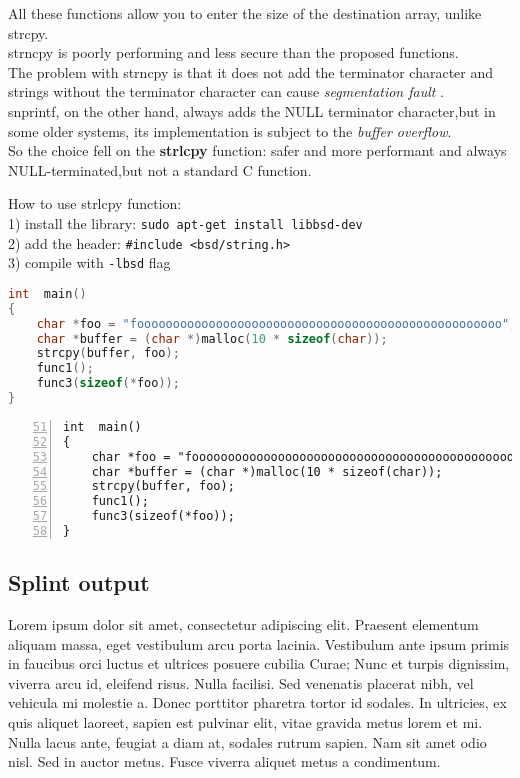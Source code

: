 \documentclass[a4paper,12pt]{article}
\newenvironment{SpecialPar}
  {\begin{shaded}}
  {\end{shaded}}
\begin{document}
All these functions allow you to enter the size of the destination array, unlike strcpy.\\
strncpy is poorly performing and less secure than the proposed functions.\\
The problem with strncpy is that it does not add the terminator character and strings without the terminator character can cause \textit{segmentation fault} \cite{geeksstrcpy}.\\
snprintf, on the other hand, always adds the NULL terminator character,but in some older systems, its implementation is subject to the \textit{buffer overflow}\cite{dangerc}.\\
So the choice fell on the \textbf{strlcpy} function: safer and more performant \cite{dangerc} and always NULL-terminated,but not a standard C function.\\


\begin{SpecialPar}

\noindent
How to use strlcpy function:\\
 1) install the library: \texttt{sudo apt-get install libbsd-dev}\\
 2) add the header: \texttt{\#include <bsd/string.h>}\\
 3) compile with \texttt{-lbsd} flag\\
\end{SpecialPar}


\begin{lstlisting}[language=c++]
int  main()
{
	char *foo = "fooooooooooooooooooooooooooooooooooooooooooooooooooo";
	char *buffer = (char *)malloc(10 * sizeof(char));
	strcpy(buffer, foo);
	func1();
	func3(sizeof(*foo));
}
\end{lstlisting}


\centering
\begin{lstlisting}[numbers=left,firstnumber=51,linebackgroundcolor={\ifnum\value{lstnumber}=55\color{red}\fi}]
int  main()
{
	char *foo = "fooooooooooooooooooooooooooooooooooooooooooooooooooo";
	char *buffer = (char *)malloc(10 * sizeof(char));
	strcpy(buffer, foo);
	func1();
	func3(sizeof(*foo));
}
\end{lstlisting}



\subsection{Splint output}
Lorem ipsum dolor sit amet, consectetur adipiscing elit. Praesent elementum aliquam massa, eget vestibulum arcu porta lacinia. Vestibulum ante ipsum primis in faucibus orci luctus et ultrices posuere cubilia Curae; Nunc et turpis dignissim, viverra arcu id, eleifend risus. Nulla facilisi. Sed venenatis placerat nibh, vel vehicula mi molestie a. Donec porttitor pharetra tortor id sodales. In ultricies, ex quis aliquet laoreet, sapien est pulvinar elit, vitae gravida metus lorem et mi. Nulla lacus ante, feugiat a diam at, sodales rutrum sapien. Nam sit amet odio nisl. Sed in auctor metus. Fusce viverra aliquet metus a condimentum.
\end{document}
